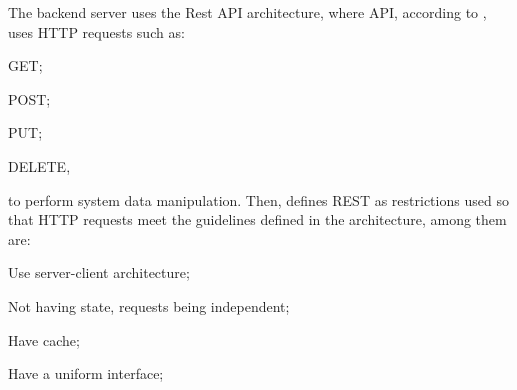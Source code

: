\begin{description}
    
    The backend server uses the Rest API architecture, where \ac{API}, according to \textcite{restApi}, uses \ac{HTTP} requests such as:
    \begin{inparaenum}[(1)]
      \item GET;
      \item POST;
      \item PUT;
      \item DELETE, 
    \end{inparaenum} to perform system data manipulation. Then, \textcite{restApi} defines \ac{REST} as restrictions used so that \ac{HTTP} requests meet the guidelines defined in the architecture, among them are:
    \begin{inparaenum}[(1)]
      \item Use server-client architecture;
      \item Not having state, requests being independent;
      \item Have cache;
      \item Have a uniform interface;
    \end{inparaenum}
    
    

\end{description}
